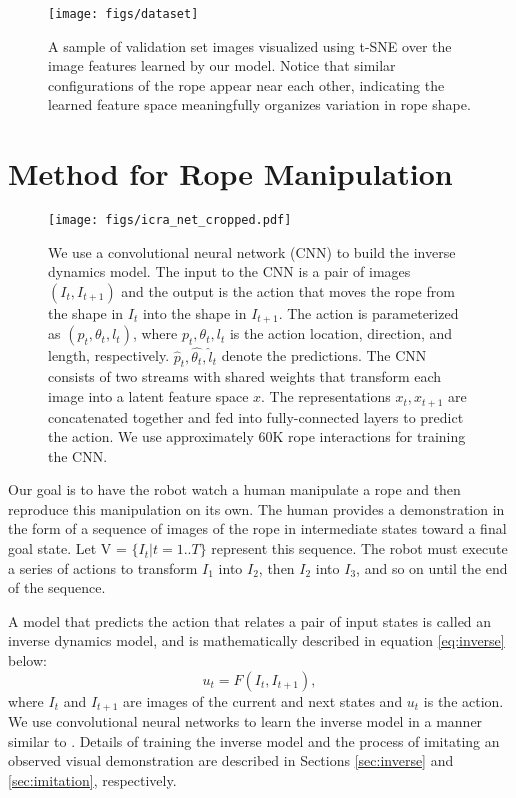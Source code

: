 \documentclass[letterpaper, 10 pt, conference]{ieeeconf}  %
\begin{document}
\begin{figure}%
    \centering
    \texttt{[image: figs/dataset]}
    \caption{A sample of validation set images visualized using t-SNE \cite{maaten2008visualizing} over the image features learned by our model. Notice that similar configurations of the rope appear near each other, indicating the learned feature space meaningfully organizes variation in rope shape.}%
    \label{fig:dataset}%
\end{figure}

\section{Method for Rope Manipulation}
\label{sec:method}

\begin{figure*}[t]%
    \centering
    \texttt{[image: figs/icra\_net\_cropped.pdf]}
    \caption{We use a convolutional neural network (CNN) to build the inverse dynamics model. The input to the CNN is a pair of images $(I_t, I_{t+1})$ and the output is the action that moves the rope from the shape in $I_t$ into the shape in $I_{t+1}$. The action is parameterized as $(p_t, \theta_t, l_t)$, where  $p_t, \theta_t, l_t$ is the action location, direction, and length, respectively. $\hat{p}_t, \hat{\theta_t}, \hat{l}_t$ denote the predictions. The CNN consists of two streams with shared weights that transform each image into a latent feature space $x$. The representations $x_t, x_{t+1}$ are concatenated together and fed into fully-connected layers to predict the action. We use approximately 60K rope interactions for training the CNN.}%
    \label{fig:network}%
\end{figure*}

Our goal is to have the robot watch a human manipulate a rope and then reproduce this manipulation on its own. The human provides a demonstration in the form of a sequence of images of the rope in intermediate states toward a final goal state. Let V = $\{I_t | t = 1..T\}$ represent this sequence. The robot must execute a series of actions to transform $I_1$ into $I_2$, then $I_{2}$ into $I_{3}$, and so on until the end of the sequence.

A model that predicts the action that relates a pair of input states is called an inverse dynamics model, and is mathematically described in equation \ref{eq:inverse} below:
\begin{equation}
    \label{eq:inverse}
    {u}_{t} = F(I_t, I_{t+1}),
\end{equation}
where $I_t$ and $I_{t+1}$ are images of the current and next states and $u_t$ is the action. 
We use convolutional neural networks to learn the inverse model in a manner similar to \cite{agrawal2016poking,pinto2016curious}. Details of training the inverse model and the process of imitating an observed visual demonstration are described in Sections \ref{sec:inverse} and \ref{sec:imitation}, respectively. 
\end{document}
